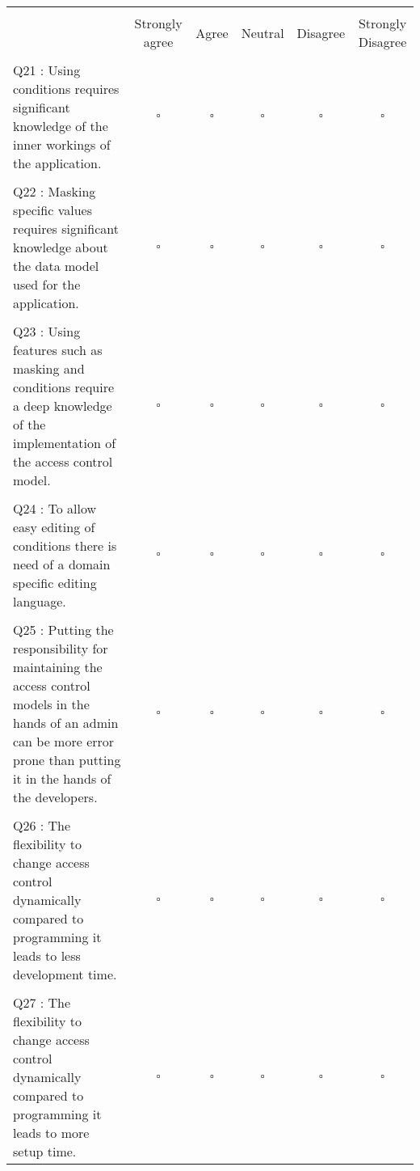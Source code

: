 \hskip-2.8cm\begin{tabular}{p{5cm} c c c c c}
    \multicolumn{6}{c}{} \\        
    & Strongly agree & Agree & Neutral  & Disagree & Strongly Disagree \\
    \\
    Q21 : Using conditions requires significant knowledge of the inner workings of the application.
    & $\square$ & $\square$ & $\square$ & $\square$ & $\square$\\
    \\
    Q22 : Masking specific values requires significant knowledge about the data model used for the application.
    & $\square$ & $\square$ & $\square$ & $\square$ & $\square$\\
    \\
    Q23 : Using features such as masking and conditions require a deep knowledge of the implementation of the access control model.
    & $\square$ & $\square$ & $\square$ & $\square$ & $\square$\\
    \\
    Q24 : To allow easy editing of conditions there is need of a domain specific editing language.
    & $\square$ & $\square$ & $\square$ & $\square$ & $\square$\\
    \\
    Q25 : Putting the responsibility for maintaining the access control models in the hands of an admin can be more error prone than putting it in the hands of the developers.
    & $\square$ & $\square$ & $\square$ & $\square$ & $\square$\\
    \\
    Q26 : The flexibility to change access control dynamically compared to programming it leads to less development time.
    & $\square$ & $\square$ & $\square$ & $\square$ & $\square$\\
    \\
    Q27 : The flexibility to change access control dynamically compared to programming it leads to more setup time.
    & $\square$ & $\square$ & $\square$ & $\square$ & $\square$\\

\end{tabular}



